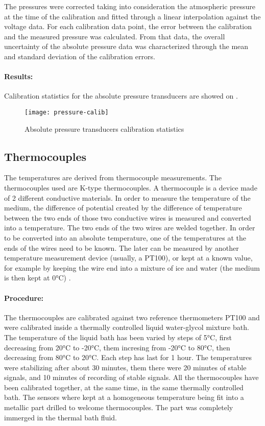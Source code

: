 The pressures were corrected taking into consideration the atmospheric
pressure at the time of the calibration and fitted through a linear
interpolation against the voltage data. For each calibration data
point, the error between the calibration and the measured pressure was
calculated. From that data, the overall uncertainty of the absolute
pressure data was characterized through the mean and standard
deviation of the calibration errors.

\paragraph{Results:}

Calibration statistics for the absolute pressure transducers are
showed on .

\begin{figure}[h!htbp]
  \centering
  \texttt{[image: pressure-calib]}
  \caption{Absolute pressure transducers calibration statistics}
  \label{fig:bwp-P-calib-stats}
\end{figure}

\subsection{Thermocouples}
\label{sec:bwp-T}

The temperatures are derived from thermocouple measurements. The
thermocouples used are K-type thermocouples. A thermocouple is a
device made of 2 different conductive materials. In order to measure
the temperature of the medium, the difference of potential created by
the difference of temperature between the two ends of those two
conductive wires is measured and converted into a temperature. The two
ends of the two wires are welded together. In order to be converted
into an absolute temperature, one of the temperatures at the ends of
the wires need to be known. The later can be measured by another
temperature measurement device (usually, a PT100), or kept at a known
value, for example by keeping the wire end into a mixture of ice and
water (the medium is then kept at 0°C)
\citep[p. 5]{rapin-jacquard-2010a}.

\paragraph{Procedure:}

The thermocouples are calibrated against two reference thermometers
PT100 and were calibrated inside a thermally controlled liquid
water-glycol mixture bath. The temperature of the liquid bath has been
varied by steps of 5\si{\degreeCelsius}, first decreasing from 20°C to
-20°C, them incresing from -20°C to 80°C, then decreasing from 80°C to
20°C. Each step has last for 1 hour. The temperatures were stabilizing
after about 30 minutes, them there were 20 minutes of stable signals,
and 10 minutes of recording of stable signals. All the thermocouples
have been calibrated together, at the same time, in the same thermally
controlled bath. The sensors where kept at a homogeneous temperature
being fit into a metallic part drilled to welcome thermocouples. The
part was completely immerged in the thermal bath fluid.

